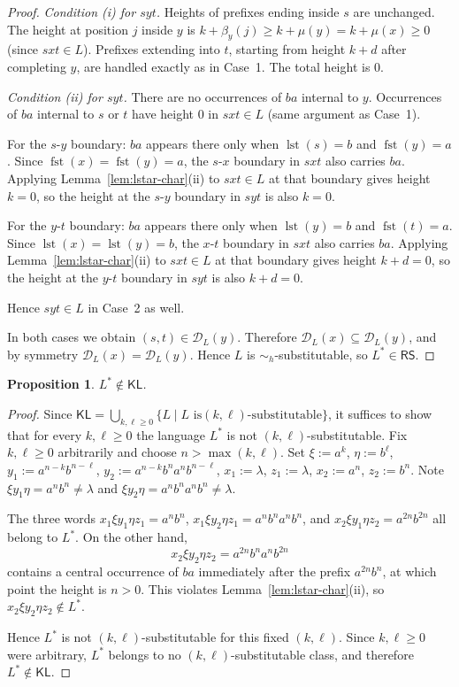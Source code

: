 \documentclass[11pt,a4paper]{article}
\newtheorem{proposition}[theorem]{Proposition}
\begin{document}
\begin{proof}
\emph{Condition \textup{(i)} for $syt$.}
Heights of prefixes ending inside $s$ are unchanged.
The height at position $j$ inside $y$ is
$k+\beta_y(j)\ge k+\mu(y)=k+\mu(x)\ge 0$ (since $sxt\in L$).
Prefixes extending into $t$, starting from height $k+d$ after
completing $y$, are handled exactly as in Case~1.
The total height is $0$.

\emph{Condition \textup{(ii)} for $syt$.}
There are no occurrences of $ba$ internal to $y$.
Occurrences of $ba$ internal to $s$ or $t$ have height $0$ in
$sxt\in L$ (same argument as Case~1).

For the $s$-$y$ boundary: $ba$ appears there only when
$\operatorname{lst}(s)=b$ and $\operatorname{fst}(y)=a$.
Since $\operatorname{fst}(x)=\operatorname{fst}(y)=a$, the $s$-$x$
boundary in $sxt$ also carries $ba$.
Applying Lemma~\ref{lem:lstar-char}\textup{(ii)} to $sxt\in L$ at that
boundary gives height $k=0$, so the height at the $s$-$y$ boundary in
$syt$ is also $k=0$.

For the $y$-$t$ boundary: $ba$ appears there only when
$\operatorname{lst}(y)=b$ and $\operatorname{fst}(t)=a$.
Since $\operatorname{lst}(x)=\operatorname{lst}(y)=b$, the $x$-$t$
boundary in $sxt$ also carries $ba$.
Applying Lemma~\ref{lem:lstar-char}\textup{(ii)} to $sxt\in L$ at that
boundary gives height $k+d=0$, so the height at the $y$-$t$ boundary
in $syt$ is also $k+d=0$.

Hence $syt\in L$ in Case~2 as well.

In both cases we obtain $(s,t)\in\mathcal{D}_L(y)$.
Therefore $\mathcal{D}_L(x)\subseteq\mathcal{D}_L(y)$, and by symmetry
$\mathcal{D}_L(x)=\mathcal{D}_L(y)$.
Hence $L$ is $\sim_h$-substitutable, so $L^*\in\mathsf{RS}$.
\end{proof}

\begin{proposition}\label{prop:lstar-not-kl}
$L^*\notin\mathsf{KL}$.
\end{proposition}

\begin{proof}
Since $\mathsf{KL}=\bigcup_{k,\ell\ge 0}\{L\mid L\text{ is
}(k,\ell)\text{-substitutable}\}$, it suffices to show that for every
$k,\ell\ge 0$ the language $L^*$ is not $(k,\ell)$-substitutable.
Fix $k,\ell\ge 0$ arbitrarily and choose $n>\max(k,\ell)$.
Set $\xi:=a^k$, $\eta:=b^\ell$,
$y_1:=a^{n-k}b^{n-\ell}$,
$y_2:=a^{n-k}b^na^nb^{n-\ell}$,
$x_1:=\lambda$, $z_1:=\lambda$,
$x_2:=a^n$, $z_2:=b^n$.
Note $\xi y_1\eta=a^nb^n\ne\lambda$ and
$\xi y_2\eta=a^nb^na^nb^n\ne\lambda$.

The three words
$x_1\xi y_1\eta z_1=a^nb^n$,
$x_1\xi y_2\eta z_1=a^nb^na^nb^n$, and
$x_2\xi y_1\eta z_2=a^{2n}b^{2n}$
all belong to $L^*$.
On the other hand,
\[
  x_2\xi y_2\eta z_2=a^{2n}b^na^nb^{2n}
\]
contains a central occurrence of $ba$ immediately after the prefix
$a^{2n}b^n$, at which point the height is $n>0$.
This violates Lemma~\ref{lem:lstar-char}\textup{(ii)}, so
$x_2\xi y_2\eta z_2\notin L^*$.

Hence $L^*$ is not $(k,\ell)$-substitutable for this fixed $(k,\ell)$.
Since $k,\ell\ge 0$ were arbitrary, $L^*$ belongs to no
$(k,\ell)$-substitutable class, and therefore $L^*\notin\mathsf{KL}$.
\end{proof}
\end{document}
